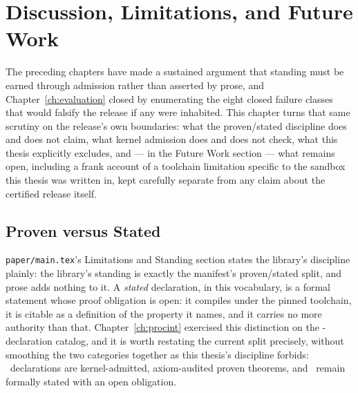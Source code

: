 \chapter{Discussion, Limitations, and Future Work}
\label{ch:discussion}

The preceding chapters have made a sustained argument that standing must
be earned through admission rather than asserted by prose, and
Chapter~\ref{ch:evaluation} closed by enumerating the eight closed
failure classes that would falsify the release if any were inhabited.
This chapter turns that same scrutiny on the release's own boundaries:
what the proven/stated discipline does and does not claim, what kernel
admission does and does not check, what this thesis explicitly excludes,
and --- in the Future Work section --- what remains open, including a
frank account of a toolchain limitation specific to the sandbox this
thesis was written in, kept carefully separate from any claim about the
certified release itself.

\section{Proven versus Stated}
\label{sec:disc-proven-stated}

\texttt{paper/main.tex}'s Limitations and Standing section states the
library's discipline plainly: the library's standing is exactly the
manifest's proven/stated split, and prose adds nothing to it. A
\emph{stated} declaration, in this vocabulary, is a formal statement
whose proof obligation is open: it compiles under the pinned toolchain,
it is citable as a definition of the property it names, and it carries no
more authority than that. Chapter~\ref{ch:procint} exercised this
distinction on the \TotalDecls-declaration catalog, and it is worth
restating the current split precisely, without smoothing the two
categories together as this thesis's discipline forbids: \KernelTheorems\
declarations are kernel-admitted, axiom-audited proven theorems, and
\StatedCount\ remain formally stated with an open obligation.

